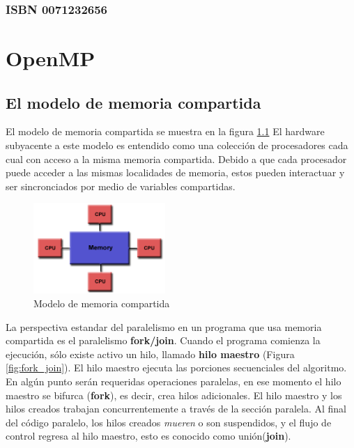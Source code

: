 \documentclass[12pt,letterpaper]{book}
\begin{document}
\subsection*{\center \normalsize ISBN 0071232656}
%
%
\tableofcontents
%
\mainmatter
%
\chapter{OpenMP}
\newpage
\section{El modelo de memoria compartida}
El modelo de memoria compartida se muestra en la figura \ref{fig:shared_mem} %
El hardware subyacente a este modelo es entendido como una colección de procesadores cada cual con acceso a la misma memoria compartida. Debido a que cada procesador puede acceder a las mismas localidades de memoria, estos pueden interactuar y ser sincronciados  por medio de variables compartidas.

\begin{figure}[ht]
\begin{center}
\includegraphics[width=5cm]{../imagenes/shared_mem.png} 
\end{center}
\caption{Modelo de memoria compartida}
\label{fig:shared_mem}
\end{figure}

La perspectiva estandar del paralelismo en un programa que usa memoria compartida es el paralelismo \textbf{fork/join}. Cuando el programa comienza la ejecución, sólo existe activo un hilo, llamado \textbf{hilo maestro} (Figura \ref{fig:fork_join}). El hilo maestro ejecuta las porciones secuenciales del algoritmo. En algún punto serán requeridas operaciones paralelas, en ese momento el hilo maestro se bifurca (\textbf{fork}), es decir, crea hilos adicionales. El hilo maestro y los hilos creados trabajan concurrentemente a través de la sección paralela. Al final del código paralelo, los hilos creados \textit{mueren} o son suspendidos, y el flujo de control regresa al hilo maestro, esto es conocido como unión(\textbf{join}).
\end{document}
